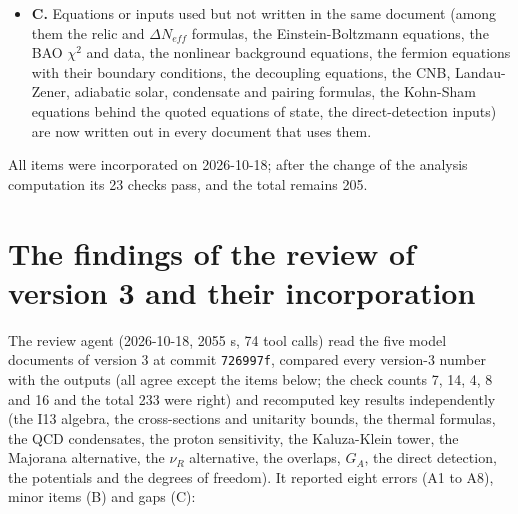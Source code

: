 \documentclass[
  10pt,
]{article}
\begin{document}
\begin{itemize}
  (\(0.0333 \pm 0.0007\)) now distinguished; the conventions of the
  supernova resonances stated (two-flavour conditions); the tip matrices
  equal the mixing matrices only with \(\kappa_e = \kappa_u = 1\); the
  measured values enter as fit targets, direct inputs or comparisons;
  the single-species requirement \((17.6\ \text{TeV})^{-3}\) is a
  version-2 number; the sum rules are absolute (\(1.0\times10^{-8}\);
  relative \(7.8\times10^{-4}\) and \(6.0\times10^{-4}\) for \(W^\pm\)
  and \(Z\)); the 50-digit roots are compared with the stored masses
  (\(4.5\times10^{-11}\)); the temperature of the neutrino spectrum in
  the cosmology; the difference \(0.0044\) to \(0.0053\) from the
  precision \(N_{eff}\); the labels ESTIMATE and STANDARD; notational
  clashes (\(H\) as the Hubble rate, \(M_{Pl}\), \(\Lambda_0\),
  \(G(u)\), \(\mu_N\), the portal amplitude \(e\), \(\alpha\), \(F\) and
  \(F_h\), the field names of PROVENANCE) added to the symbol lists; the
  dark-matter mass written \(44.35\) TeV everywhere.
\item
  \textbf{C.} Equations or inputs used but not written in the same
  document (among them the relic and \(\Delta N_{eff}\) formulas, the
  Einstein-Boltzmann equations, the BAO \(\chi^2\) and data, the
  nonlinear background equations, the fermion equations with their
  boundary conditions, the decoupling equations, the CNB, Landau-Zener,
  adiabatic solar, condensate and pairing formulas, the Kohn-Sham
  equations behind the quoted equations of state, the direct-detection
  inputs) are now written out in every document that uses them.
\end{itemize}

All items were incorporated on 2026-10-18; after the change of the
analysis computation its 23 checks pass, and the total remains 205.

\hypertarget{the-findings-of-the-review-of-version-3-and-their-incorporation}{%
\section{The findings of the review of version 3 and their
incorporation}\label{the-findings-of-the-review-of-version-3-and-their-incorporation}}

The review agent (2026-10-18, 2055 s, 74 tool calls) read the five model
documents of version 3 at commit \texttt{726997f}, compared every
version-3 number with the outputs (all agree except the items below; the
check counts 7, 14, 4, 8 and 16 and the total 233 were right) and
recomputed key results independently (the I13 algebra, the
cross-sections and unitarity bounds, the thermal formulas, the QCD
condensates, the proton sensitivity, the Kaluza-Klein tower, the
Majorana alternative, the \(\nu_R\) alternative, the overlaps, \(G_A\),
the direct detection, the potentials and the degrees of freedom). It
reported eight errors (A1 to A8), minor items (B) and gaps (C):
\end{document}
